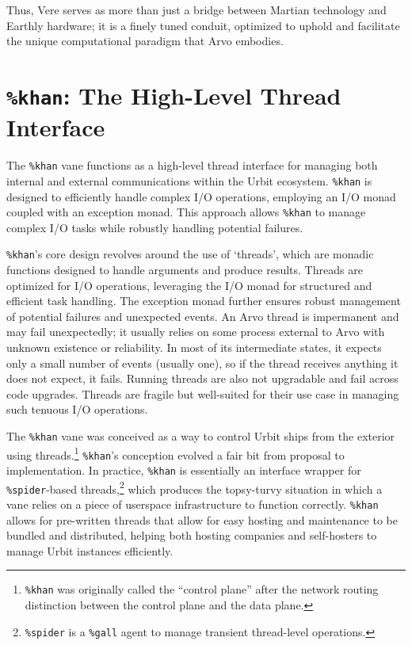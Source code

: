 \documentclass[twoside]{article}
\begin{document}
Thus, Vere serves as more than just a bridge between Martian technology and Earthly hardware; it is a finely tuned conduit, optimized to uphold and facilitate the unique computational paradigm that Arvo embodies.


\section{\texttt{\%khan}:  The High-Level Thread Interface}

The \texttt{\%khan} vane functions as a high-level thread interface for managing both internal and external communications within the Urbit ecosystem.  \texttt{\%khan} is designed to efficiently handle complex I/O operations, employing an I/O monad coupled with an exception monad.  This approach allows \texttt{\%khan} to manage complex I/O tasks while robustly handling potential failures.

\texttt{\%khan}'s core design revolves around the use of `threads', which are monadic functions designed to handle arguments and produce results.  Threads are optimized for I/O operations, leveraging the I/O monad for structured and efficient task handling.  The exception monad further ensures robust management of potential failures and unexpected events.  An Arvo thread is impermanent and may fail unexpectedly; it usually relies on some process external to Arvo with unknown existence or reliability.  In most of its intermediate states, it expects only a small number of events (usually one), so if the thread receives anything it does not expect, it fails.  Running threads are also not upgradable and fail across code upgrades.  Threads are fragile but well-suited for their use case in managing such tenuous I/O operations.

\sloppy
The \texttt{\%khan} vane was conceived as a way to control Urbit ships from the exterior using threads.\footnote{\texttt{\%khan} was originally called the ``control plane'' after the network routing distinction between the control plane and the data plane.}  \texttt{\%khan}'s conception evolved a fair bit from proposal to implementation.  In practice, \texttt{\%khan} is essentially an interface wrapper for \texttt{\%spider}-based threads,\footnote{\texttt{\%spider} is a \texttt{\%gall} agent to manage transient thread-level operations.} which produces the topsy-turvy situation in which a vane relies on a piece of userspace infrastructure to function correctly.  \texttt{\%khan} allows for pre-written threads that allow for easy hosting and maintenance to be bundled and distributed, helping both hosting companies and self-hosters to manage Urbit instances efficiently. 
\end{document}
